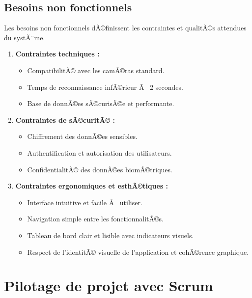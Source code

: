 \subsection{Besoins non fonctionnels}

Les besoins non fonctionnels dÃ©finissent les contraintes et qualitÃ©s attendues du systÃ¨me.

\begin{enumerate}[label=\alph*)]
  \item \textbf{Contraintes techniques :}
    \begin{itemize}
      \item CompatibilitÃ© avec les camÃ©ras standard.
      \item Temps de reconnaissance infÃ©rieur Ã  2 secondes.
      \item Base de donnÃ©es sÃ©curisÃ©e et performante.
    \end{itemize}

  \item \textbf{Contraintes de sÃ©curitÃ© :}
    \begin{itemize}
      \item Chiffrement des donnÃ©es sensibles.
      \item Authentification et autorisation des utilisateurs.
      \item ConfidentialitÃ© des donnÃ©es biomÃ©triques.
    \end{itemize}

  \item \textbf{Contraintes ergonomiques et esthÃ©tiques :}
    \begin{itemize}
      \item Interface intuitive et facile Ã  utiliser.
      \item Navigation simple entre les fonctionnalitÃ©s.
      \item Tableau de bord clair et lisible avec indicateurs visuels.
      \item Respect de l'identitÃ© visuelle de l'application et cohÃ©rence graphique.
    \end{itemize}
\end{enumerate}

\section{Pilotage de projet avec Scrum}

